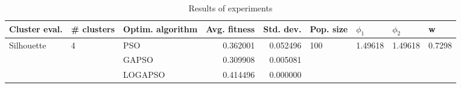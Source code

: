 \begin{table}
\centering
\caption{Results of experiments}
\begin{tabular}{lllrrllll}
\toprule
              Cluster eval. &        \# clusters & Optim. algorithm &  Avg. fitness &  Std. dev. &            Pop. size &               $\phi_{1}$ &               $\phi_{2}$ &                       w \\
\midrule
\multirow{3}{*}{Silhouette} & \multirow{3}{*}{4} &              PSO &      0.362001 &   0.052496 & \multirow{3}{*}{100} & \multirow{3}{*}{1.49618} & \multirow{3}{*}{1.49618} & \multirow{3}{*}{0.7298} \\
                            &                    &            GAPSO &      0.309908 &   0.005081 &                      &                          &                          &                         \\
                            &                    &          LOGAPSO &      0.414496 &   0.000000 &                      &                          &                          &                         \\
\bottomrule
\end{tabular}
\end{table}
